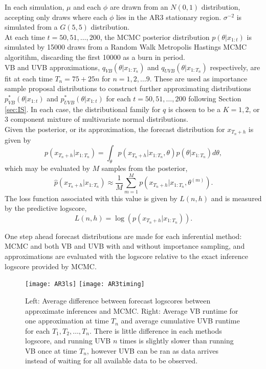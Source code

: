 \documentclass[12pt,a4paper]{article}\usepackage[]{graphicx}\usepackage[]{color}
\begin{document}
In each simulation, $\mu$ and each $\phi$ are drawn from an $N(0, 1)$ distribution, accepting only draws where each $\phi$ lies in the AR3 stationary region. $\sigma^{-2}$ is simulated from a $G(5, 5)$ distribution.
\\

At each time $t = 50, 51, \dots, 200$, the MCMC posterior distribution $p(\theta | x_{1:t})$ is simulated by 15000 draws from a Random Walk Metropolis Hastings MCMC algoritihm, discarding the first 10000 as a burn in period.
\\

VB and UVB approximations, $q_{VB}(\theta | x_{1:T_n})$ and $q_{UVB}(\theta | x_{1:T_n})$ respectively, are fit at each time $T_n = 75 + 25n$ for $n = 1, 2, \dots 9$. These are used as importance sample proposal distributions to construct further approximating distributions $p^*_{VB}(\theta | x_{1:t})$ and $p^*_{UVB}(\theta | x_{1:t})$ for each $t = 50, 51, \dots, 200$ following Section \ref{sec:IS}. In each case, the distributional family for $q$ is chosen to be a $K = 1, 2$, or $3$ component mixture of multivariate normal distributions.
\\

Given the posterior, or its approximation, the forecast distribution for $x_{T_n+h}$ is given by
\begin{equation}
\label{forecastDist}
p(x_{T_n + h} | x_{1:T_n}) = \int_{\theta} p(x_{T_n + h} | x_{1:T_n}, \theta)p(\theta | x_{1:T_n})d\theta,
\end{equation}
which may be evaluated by $M$ samples from the posterior,
\begin{equation}
\label{forecastDist}
\hat{p}(x_{T_n + h} | x_{1:T_n}) \approx \frac{1}{M} \sum_{m=1}^M  p(x_{T_n + h} | x_{1:T_n}, \theta^{(m)}).
\end{equation}
The loss function associated with this value is given by $L(n, h)$ and is measured by the predictive logscore,
\begin{equation}
\label{loss:logscore}
L(n, h) = \log(p(x_{T_n + h} | x_{1:T_n})).
\end{equation}

One step ahead forecast distributions are made for each inferential method: MCMC and both VB and UVB with and without importance sampling, and approximations are evaluated with the logscore relative to the exact inference logscore provided by MCMC. 

\begin{figure}%
    \centering
    {{\texttt{[image: AR3ls]} }}%
    \qquad
    {{\texttt{[image: AR3timing]} }}%
    \caption{Left: Average difference between forecast logscores between approximate inferences and MCMC. Right: Average VB runtime for one approximation at time $T_n$ and average cumulative UVB runtime for each $T_1, T_2, \dots, T_n$. There is little difference in each methods logscore, and running UVB $n$ times is slightly slower than running VB once at time $T_n$, however UVB can be ran as data arrives instead of waiting for all available data to be observed.}%
    \label{fig:AR3Timing}%
\end{figure}
\end{document}
